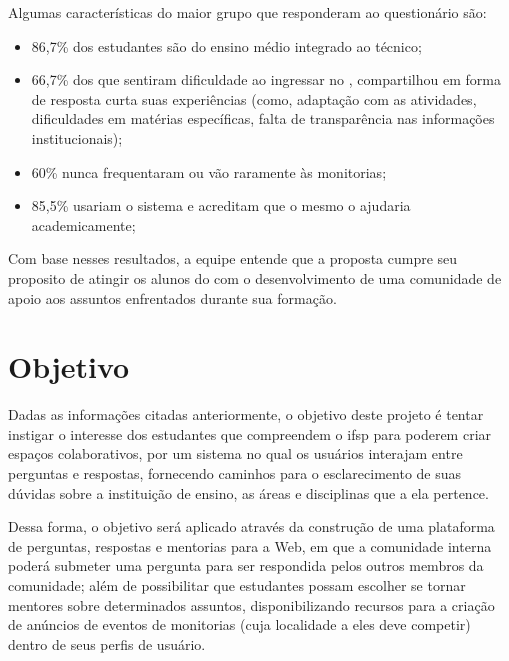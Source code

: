 Algumas características do maior grupo que responderam ao questionário são: 

\begin{itemize}
    \item 86,7\% dos estudantes são do ensino médio integrado ao técnico;
    \item 66,7\% dos que sentiram dificuldade ao ingressar no , compartilhou em forma de resposta curta suas experiências (como, adaptação com as atividades, dificuldades em matérias específicas, falta de transparência nas informações institucionais);
    \item 60\% nunca frequentaram ou vão raramente às monitorias;
    \item 85,5\% usariam o sistema e acreditam que o mesmo o ajudaria academicamente;
\end{itemize}

Com base nesses resultados, a equipe entende que a proposta cumpre seu proposito de atingir os alunos do  com o desenvolvimento de uma comunidade de apoio aos assuntos enfrentados durante sua formação.

\section{Objetivo}

Dadas as informações citadas anteriormente, o objetivo deste projeto é tentar instigar o interesse dos estudantes que compreendem o \acs{ifsp} para poderem criar espaços colaborativos, por um sistema no qual os usuários interajam entre perguntas e respostas, fornecendo caminhos para o esclarecimento de suas dúvidas sobre a instituição de ensino, as áreas e disciplinas que a ela pertence.  

Dessa forma, o objetivo será aplicado através da construção de uma plataforma de perguntas, respostas e mentorias para a Web, em que a comunidade interna poderá submeter uma pergunta para ser respondida pelos outros membros da comunidade; além de possibilitar que estudantes possam escolher se tornar mentores sobre determinados assuntos, disponibilizando recursos para a criação de anúncios de eventos de monitorias (cuja localidade a eles deve competir) dentro de seus perfis de usuário. 

